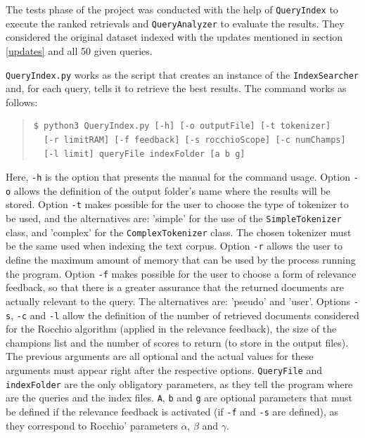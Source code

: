 \documentclass[12pt]{article}
\begin{document}
The tests phase of the project was conducted with the help of \texttt{QueryIndex}
to execute the ranked retrievals and \texttt{QueryAnalyzer} to evaluate the results.
They considered the original dataset indexed with the updates mentioned in section
\ref{updates} and all 50 given queries.

\texttt{QueryIndex.py} works as the script that creates an instance of the 
\texttt{IndexSearcher} and, for each query, tells it to retrieve the best results.
The command works as follows:

\begingroup
\addtolength\leftmargini{-0.4in}
\addtolength\baselineskip{-0.05in}
\begin{quote}
\begin{verbatim}
$ python3 QueryIndex.py [-h] [-o outputFile] [-t tokenizer] 
  [-r limitRAM] [-f feedback] [-s rocchioScope] [-c numChamps] 
  [-l limit] queryFile indexFolder [a b g]
\end{verbatim}
\end{quote}
\endgroup

Here, \texttt{-h} is the option that presents the manual for the command usage.
Option \texttt{-o} allows the definition of the output folder's name where the
results will be stored.
Option \texttt{-t} makes possible for the user to choose the type of tokenizer
to be used, and the alternatives are: 'simple' for the use of the 
\texttt{SimpleTokenizer} class, and 'complex' for the \texttt{ComplexTokenizer} class.
The chosen tokenizer must be the same used when indexing the text corpus.
Option \texttt{-r} allows the user to define the maximum amount of memory that can
be used by the process running the program.
Option \texttt{-f} makes possible for the user to choose a form of relevance 
feedback, so that there is a greater assurance that the returned documents are
actually relevant to the query. 
The alternatives are: 'pseudo' and 'user'.
Options \texttt{-s}, \texttt{-c} and \texttt{-l} allow the definition of the 
number of retrieved documents considered for the Rocchio algorithm (applied in
the relevance feedback), the size of the champions list and the number of scores
to return (to store in the output files).
The previous arguments are all optional and the actual values for these arguments
must appear right after the respective options.
\texttt{QueryFile} and \texttt{indexFolder} are the only obligatory parameters,
as they tell the program where are the queries and the index files.
\texttt{A}, \texttt{b} and \texttt{g} are optional parameters that must be defined
if the relevance feedback is activated (if \texttt{-f} and \texttt{-s} are defined), 
as they correspond to Rocchio' parameters $\alpha$, $\beta$ and $\gamma$.
\end{document}
